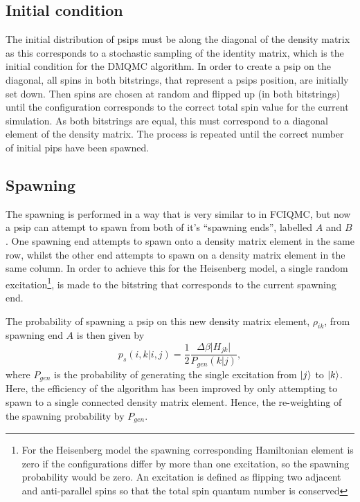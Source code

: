 \subsection{Initial condition}
The initial distribution of psips must be along the diagonal of the density matrix as this corresponds to a stochastic sampling of the identity matrix, which is the initial condition for the DMQMC algorithm. In order to create a psip on the diagonal, all spins in both bitstrings, that represent a psips position, are initially set down. Then spins are chosen at random and flipped up (in both bitstrings) until the configuration corresponds to the correct total spin value for the current simulation. As both bitstrings are equal, this must correspond to a diagonal element of the density matrix. The process is repeated until the correct number of initial pips have been spawned.
\subsection{Spawning}
The spawning is performed in a way that is very similar to in FCIQMC, but now a psip can attempt to spawn from both of it's ``spawning ends'', labelled $A$ and $B$. One spawning end attempts to spawn onto a density matrix element in the same row, whilst the other end attempts to spawn on a density matrix element in the same column. In order to achieve this for the Heisenberg model, a single random excitation\footnote{For the Heisenberg model the spawning corresponding Hamiltonian element is zero if the configurations differ by more than one excitation, so the spawning probability would be zero. An excitation is defined as flipping two adjacent and anti-parallel spins so that the total spin quantum number is conserved}, is made to the bitstring that corresponds to the current spawning end. 

The probability of spawning a psip on this new density matrix element, $\rho_{ik}$, from spawning end $A$ is then given by
\begin{equation}
p_s(i,k | i,j) = \frac{1}{2}\frac{\Delta\beta\lvert H_{jk}\rvert}{P_{gen}(k|j)},
\end{equation}
where $P_{gen}$ is the probability of generating the single excitation from $\ket{j}$ to $\ket{k}$. Here, the efficiency of the algorithm has been improved by only attempting to spawn to a single connected density matrix element. Hence, the re-weighting of the spawning probability by $P_{gen}$.

